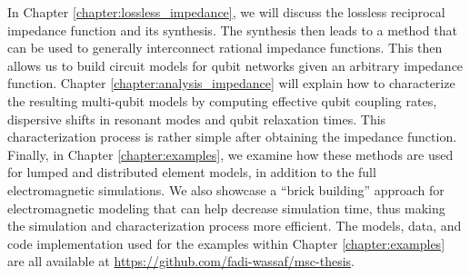 In Chapter \ref{chapter:lossless_impedance}, we will discuss the lossless reciprocal impedance function and its synthesis. The synthesis then leads to a method that can be used to generally interconnect rational impedance functions. This then allows us to build circuit models for qubit networks given an arbitrary impedance function. Chapter \ref{chapter:analysis_impedance} will explain how to characterize the resulting multi-qubit models by computing effective qubit coupling rates, dispersive shifts in resonant modes and qubit relaxation times. This characterization process is rather simple after obtaining the impedance function. Finally, in Chapter \ref{chapter:examples}, we examine how these methods are used for lumped and distributed element models, in addition to the full electromagnetic simulations. We also showcase a ``brick building” approach for electromagnetic modeling that can help decrease simulation time, thus making the simulation and characterization process more efficient. The models, data, and code implementation used for the examples within Chapter \ref{chapter:examples} are all available at \url{https://github.com/fadi-wassaf/msc-thesis}.
